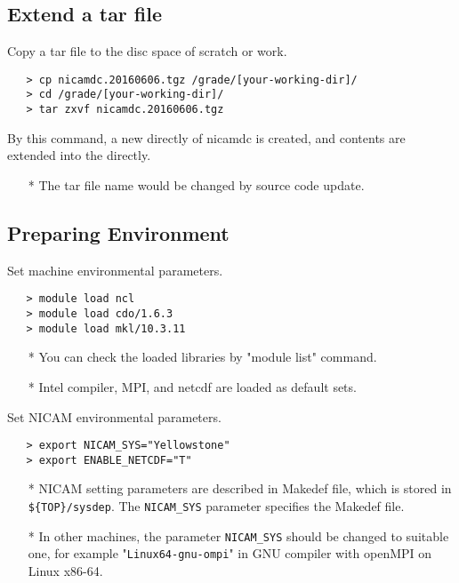 \documentclass[a4paper]{article}
\begin{document}
\subsection{Extend a tar file}
 Copy a tar file to the disc space of scratch or work.

 \begin{verbatim}
   > cp nicamdc.20160606.tgz /grade/[your-working-dir]/
   > cd /grade/[your-working-dir]/
   > tar zxvf nicamdc.20160606.tgz
 \end{verbatim}

 \noindent By this command, a new directly of nicamdc is created,
 and contents are extended into the directly.

 \begin{itemize}
   \item[*] The tar file name would be changed by source code update.
 \end{itemize}


\subsection{Preparing Environment}
 Set machine environmental parameters.
 \begin{verbatim}
   > module load ncl
   > module load cdo/1.6.3
   > module load mkl/10.3.11
 \end{verbatim}

 \begin{itemize}
   \item[*] You can check the loaded libraries by "module list" command.
   \item[*] Intel compiler, MPI, and netcdf are loaded as default sets.
 \end{itemize}

 \noindent Set NICAM environmental parameters.
 \begin{verbatim}
   > export NICAM_SYS="Yellowstone"
   > export ENABLE_NETCDF="T"
 \end{verbatim}

 \begin{itemize}
   \item[*] NICAM setting parameters are described in Makedef file,
    which is stored in \verb|${TOP}/sysdep|. The \verb|NICAM_SYS| parameter
    specifies the Makedef file.
   \item[*] In other machines, the parameter \verb|NICAM_SYS| should be changed
    to suitable one, for example "\verb|Linux64-gnu-ompi|" in GNU compiler
    with openMPI on Linux x86-64.
 \end{itemize}
\end{document}
